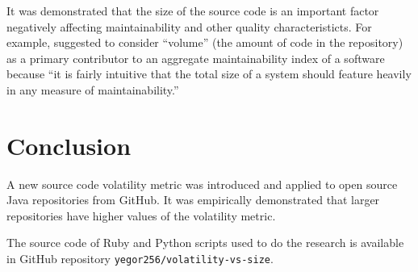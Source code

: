 \documentclass[12pt]{article}
\begin{document}
It was demonstrated that the size of the source code is an important
factor negatively affecting maintainability and other quality characteristicts.
For example, \citep{heitlager2007} suggested to consider ``volume'' (the amount of code
in the repository) as a primary contributor to an aggregate maintainability index
of a software because ``it is fairly intuitive that the total size of a system should
feature heavily in any measure of maintainability.''

\section{Conclusion}

A new source code volatility metric was introduced and applied
to \thetotalrepos{} open source Java repositories from GitHub. It was
empirically demonstrated that larger repositories have higher values
of the volatility metric.

The source code of Ruby and Python scripts used to do the research
is available in GitHub repository \texttt{yegor256/volatility-vs-size}.


\end{document}
